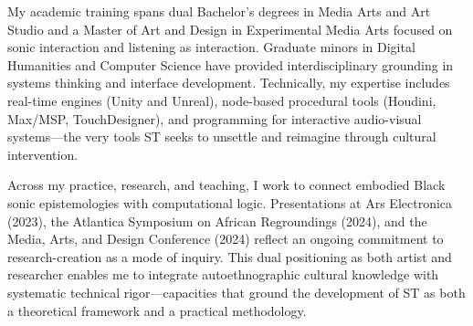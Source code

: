 My academic training spans dual Bachelor's degrees in Media Arts and Art Studio and a Master of Art and Design in Experimental Media Arts focused on sonic interaction and listening as interaction. Graduate minors in Digital Humanities and Computer Science have provided interdisciplinary grounding in systems thinking and interface development. Technically, my expertise includes real-time engines (Unity and Unreal), node-based procedural tools (Houdini, Max/MSP, TouchDesigner), and programming for interactive audio-visual systems---the very tools ST seeks to unsettle and reimagine through cultural intervention.

Across my practice, research, and teaching, I work to connect embodied Black sonic epistemologies with computational logic. Presentations at Ars Electronica (2023), the Atlantica Symposium on African Regroundings (2024), and the Media, Arts, and Design Conference (2024) reflect an ongoing commitment to research-creation as a mode of inquiry. This dual positioning as both artist and researcher enables me to integrate autoethnographic cultural knowledge with systematic technical rigor---capacities that ground the development of ST as both a theoretical framework and a practical methodology.

